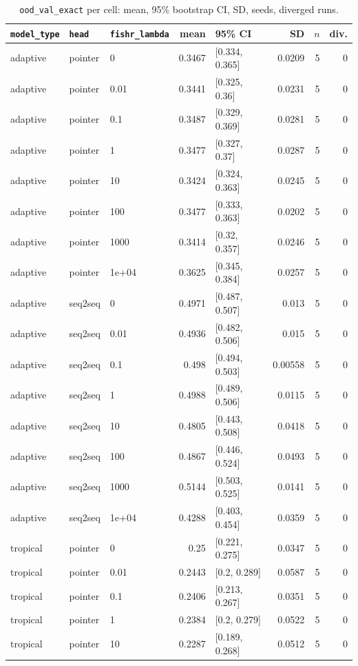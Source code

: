\documentclass[10pt]{article}
\begin{document}
{\small
\begin{longtable}{lllrlrrr}
\caption{\texttt{ood\_val\_exact} per cell: mean, 95\% bootstrap CI, SD, seeds, diverged runs.}\label{tab:summary-ood_val_exact}\\
\toprule
\texttt{model\_type} & \texttt{head} & \texttt{fishr\_lambda} & mean & 95\% CI & SD & $n$ & div.\\
\midrule
\endhead
adaptive & pointer & 0 & 0.3467 & [0.334, 0.365] & 0.0209 & 5 & 0\\
adaptive & pointer & 0.01 & 0.3441 & [0.325, 0.36] & 0.0231 & 5 & 0\\
adaptive & pointer & 0.1 & 0.3487 & [0.329, 0.369] & 0.0281 & 5 & 0\\
adaptive & pointer & 1 & 0.3477 & [0.327, 0.37] & 0.0287 & 5 & 0\\
adaptive & pointer & 10 & 0.3424 & [0.324, 0.363] & 0.0245 & 5 & 0\\
adaptive & pointer & 100 & 0.3477 & [0.333, 0.363] & 0.0202 & 5 & 0\\
adaptive & pointer & 1000 & 0.3414 & [0.32, 0.357] & 0.0246 & 5 & 0\\
adaptive & pointer & 1e+04 & 0.3625 & [0.345, 0.384] & 0.0257 & 5 & 0\\
adaptive & seq2seq & 0 & 0.4971 & [0.487, 0.507] & 0.013 & 5 & 0\\
adaptive & seq2seq & 0.01 & 0.4936 & [0.482, 0.506] & 0.015 & 5 & 0\\
adaptive & seq2seq & 0.1 & 0.498 & [0.494, 0.503] & 0.00558 & 5 & 0\\
adaptive & seq2seq & 1 & 0.4988 & [0.489, 0.506] & 0.0115 & 5 & 0\\
adaptive & seq2seq & 10 & 0.4805 & [0.443, 0.508] & 0.0418 & 5 & 0\\
adaptive & seq2seq & 100 & 0.4867 & [0.446, 0.524] & 0.0493 & 5 & 0\\
adaptive & seq2seq & 1000 & 0.5144 & [0.503, 0.525] & 0.0141 & 5 & 0\\
adaptive & seq2seq & 1e+04 & 0.4288 & [0.403, 0.454] & 0.0359 & 5 & 0\\
tropical & pointer & 0 & 0.25 & [0.221, 0.275] & 0.0347 & 5 & 0\\
tropical & pointer & 0.01 & 0.2443 & [0.2, 0.289] & 0.0587 & 5 & 0\\
tropical & pointer & 0.1 & 0.2406 & [0.213, 0.267] & 0.0351 & 5 & 0\\
tropical & pointer & 1 & 0.2384 & [0.2, 0.279] & 0.0522 & 5 & 0\\
tropical & pointer & 10 & 0.2287 & [0.189, 0.268] & 0.0512 & 5 & 0\\

\end{longtable}}
\end{document}
